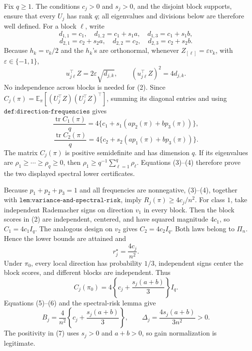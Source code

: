 Fix \(q\ge1\).  The conditions \(c_j>0\) and \(s_j>0\), and the disjoint block supports, ensure that every \(U_j\) has rank \(q\); all eigenvalues and divisions below are therefore well defined.  For a block \(\ell\), write
\[
d_{1,1}=c_1,\quad d_{1,2}=c_1+s_1a,\quad d_{1,3}=c_1+s_1b,
\]
\[
d_{2,1}=c_2+s_2a,\quad d_{2,2}=c_2,\quad d_{2,3}=c_2+s_2b. \tag{1}
\]
Because \(h_k=v_k/2\) and the \(h_k\)'s are orthonormal, whenever \(Z_{[\ell]}=\varepsilon v_k\), with \(\varepsilon\in\{-1,1\}\),
\[
u_{j\ell}^\top Z=2\varepsilon\sqrt{d_{j,k}},
\qquad
(u_{j\ell}^\top Z)^2=4d_{j,k}. \tag{2}
\]
No independence across blocks is needed for (2).  Since \(C_j(\pi)=\mathbb E_\pi[(U_j^\top Z)(U_j^\top Z)^\top]\), summing its diagonal entries and using \(\texttt{def:direction-frequencies}\) gives
\[
\frac{\operatorname{tr}C_1(\pi)}q
=4\{c_1+s_1(ap_2(\pi)+bp_3(\pi))\}, \tag{3}
\]
\[
\frac{\operatorname{tr}C_2(\pi)}q
=4\{c_2+s_2(ap_1(\pi)+bp_3(\pi))\}. \tag{4}
\]
The matrix \(C_j(\pi)\) is positive semidefinite and has dimension \(q\).  If its eigenvalues are \(\rho_1\ge\cdots\ge\rho_q\ge0\), then \(\rho_1\ge q^{-1}\sum_{\ell=1}^q\rho_\ell\).  Equations (3)--(4) therefore prove the two displayed spectral lower certificates.

Because \(p_1+p_2+p_3=1\) and all frequencies are nonnegative, (3)--(4), together with \(\texttt{lem:variance-and-spectral-risk}\), imply \(R_j(\pi)\ge4c_j/n^2\).  For class \(1\), take independent Rademacher signs on direction \(v_1\) in every block.  Then the block scores in (2) are independent, centered, and have squared magnitude \(4c_1\), so \(C_1=4c_1I_q\).  The analogous design on \(v_2\) gives \(C_2=4c_2I_q\).  Both laws belong to \(\Pi_n\).  Hence the lower bounds are attained and
\[
r_j^\star=\frac{4c_j}{n^2}. \tag{5}
\]
Under \(\pi_0\), every local direction has probability \(1/3\), independent signs center the block scores, and different blocks are independent.  Thus
\[
C_j(\pi_0)=4\left\{c_j+\frac{s_j(a+b)}3\right\}I_q. \tag{6}
\]
Equations (5)--(6) and the spectral-risk lemma give
\[
B_j=\frac4{n^2}\left\{c_j+\frac{s_j(a+b)}3\right\},
\qquad
\Delta_j=\frac{4s_j(a+b)}{3n^2}>0. \tag{7}
\]
The positivity in (7) uses \(s_j>0\) and \(a+b>0\), so gain normalization is legitimate.

